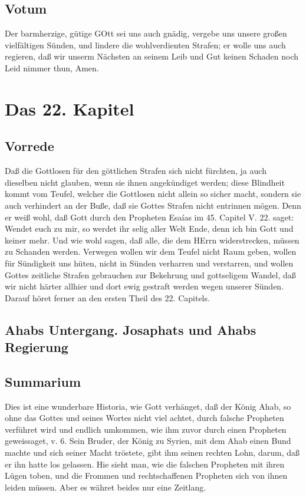 \section{Votum}

Der barmherzige, gütige GOtt sei uns auch gnädig, vergebe uns unsere großen vielfältigen Sünden, und lindere die wohlverdienten Strafen; er wolle uns auch regieren, daß wir unserm Nächsten an seinem Leib und Gut keinen Schaden noch Leid nimmer thun, Amen.

\chapter{Das 22. Kapitel}

\section{Vorrede}

Daß die Gottlosen für den göttlichen Strafen sich nicht fürchten, ja auch dieselben nicht glauben, wenn sie ihnen angekündiget werden; diese Blindheit kommt vom Teufel, welcher die Gottlosen nicht allein so sicher macht, sondern sie auch verhindert an der Buße, daß sie Gottes Strafen nicht entrinnen mögen. Denn er weiß wohl, daß Gott durch den Propheten Esaías im 45. Capitel V. 22. saget: Wendet euch zu mir, so werdet ihr selig aller Welt Ende, denn ich bin Gott und keiner mehr. Und wie wohl sagen, daß alle, die dem HErrn widerstrecken, müssen zu Schanden werden. Verwegen wollen wir dem Teufel nicht Raum geben, wollen für Sündigkeit uns hüten, nicht in Sünden verharren und verstarren, und wollen Gottes zeitliche Strafen gebrauchen zur Bekehrung und gottseligem Wandel, daß wir nicht härter allhier und dort ewig gestraft werden wegen unserer Sünden. Darauf höret ferner an den ersten Theil des 22. Capitels.

\section{Ahabs Untergang. Josaphats und Ahabs Regierung}

\section{Summarium}

Dies ist eine wunderbare Historia, wie Gott verhänget, daß der König Ahab, so ohne das Gottes und seines Wortes nicht viel achtet, durch falsche Propheten verführet wird und endlich umkommen, wie ihm zuvor durch einen Propheten geweissaget, v. 6. Sein Bruder, der König zu Syrien, mit dem Ahab einen Bund machte und sich seiner Macht tröstete, gibt ihm seinen rechten Lohn, darum, daß er ihn hatte los gelassen. Hie sieht man, wie die falschen Propheten mit ihren Lügen toben, und die Frommen und rechtschaffenen Propheten sich von ihnen leiden müssen. Aber es währet beides nur eine Zeitlang.

